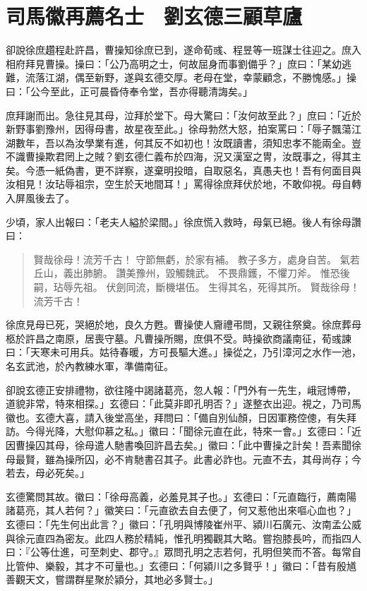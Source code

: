 
\chapter{司馬徽再薦名士　劉玄德三顧草廬}

卻說徐庶趲程赴許昌，曹操知徐庶已到，遂命荀彧、程昱等一班謀士往迎之。庶入相府拜見曹操。操曰：「公乃高明之士，何故屈身而事劉備乎？」庶曰：「某幼逃難，流落江湖，偶至新野，遂與玄德交厚。老母在堂，幸蒙顧念，不勝愧感。」操曰：「公今至此，正可晨昏侍奉令堂，吾亦得聽清誨矣。」

庶拜謝而出。急往見其母，泣拜於堂下。母大驚曰：「汝何故至此？」庶曰：「近於新野事劉豫州，因得母書，故星夜至此。」徐母勃然大怒，拍案罵曰：「辱子飄蕩江湖數年，吾以為汝學業有進，何其反不如初也！汝既讀書，須知忠孝不能兩全。豈不識曹操欺君罔上之賊？劉玄德仁義布於四海，況又漢室之冑，汝既事之，得其主矣。今憑一紙偽書，更不詳察，遂棄明投暗，自取惡名，真愚夫也！吾有何面目與汝相見！汝玷辱祖宗，空生於天地間耳！」罵得徐庶拜伏於地，不敢仰視。母自轉入屏風後去了。

少頃，家人出報曰：「老夫人縊於梁間。」徐庶慌入救時，母氣已絕。後人有徐母讚曰：

\begin{quote}
賢哉徐母！流芳千古！
守節無虧，於家有補。
教子多方，處身自苦。
氣若丘山，義出肺腑。
讚美豫州，毀觸魏武。
不畏鼎鑊，不懼刀斧。
惟恐後嗣，玷辱先祖。
伏劍同流，斷機堪伍。
生得其名，死得其所。
賢哉徐母！流芳千古！
\end{quote}

徐庶見母已死，哭絕於地，良久方甦。曹操使人齎禮弔問，又親往祭奠。徐庶葬母柩於許昌之南原，居喪守墓。凡曹操所賜，庶俱不受。時操欲商議南征，荀彧諫曰：「天寒未可用兵。姑待春暖，方可長驅大進。」操從之，乃引漳河之水作一池，名玄武池，於內教練水軍，準備南征。

卻說玄德正安排禮物，欲往隆中謁諸葛亮，忽人報：「門外有一先生，峨冠博帶，道貌非常，特來相探。」玄德曰：「此莫非即孔明否？」遂整衣出迎。視之，乃司馬徽也。玄德大喜，請入後堂高坐，拜問曰：「備自別仙顏，日因軍務倥傯，有失拜訪。今得光降，大慰仰慕之私。」徽曰：「聞徐元直在此，特來一會。」玄德曰：「近因曹操囚其母，徐母遣人馳書喚回許昌去矣。」徽曰：「此中曹操之計矣！吾素聞徐母最賢，雖為操所囚，必不肯馳書召其子。此書必詐也。元直不去，其母尚存；今若去，母必死矣。」

玄德驚問其故。徽曰：「徐母高義，必羞見其子也。」玄德曰：「元直臨行，薦南陽諸葛亮，其人若何？」徽笑曰：「元直欲去自去便了，何又惹他出來嘔心血也？」玄德曰：「先生何出此言？」徽曰：「孔明與博陵崔州平、潁川石廣元、汝南孟公威與徐元直四為密友。此四人務於精純，惟孔明獨觀其大略。嘗抱膝長吟，而指四人曰：『公等仕進，可至刺史、郡守。』眾問孔明之志若何，孔明但笑而不答。每常自比管仲、樂毅，其才不可量也。」玄德曰：「何潁川之多賢乎！」徽曰：「昔有殷馗善觀天文，嘗謂群星聚於潁分，其地必多賢士。」

